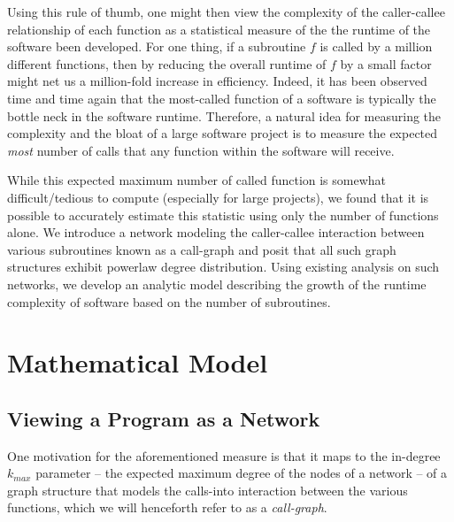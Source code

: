 \documentclass[11pt,a4paper,twocolumn]{article}
\begin{document}
\begin{singlespace}
Using this rule of thumb, one might then view the complexity of the caller-callee
relationship of each function as a statistical measure of the the runtime of the 
software been developed. For one thing, if a subroutine $f$ is called by a million 
different functions, then by reducing the overall runtime of $f$ by a small factor 
might net us a million-fold increase in efficiency. Indeed, it has been observed
time and time again \cite{something} that the most-called function of a software 
is typically the bottle neck in the software runtime. Therefore, a natural idea for
measuring the complexity and the bloat of a large software project is to measure 
the expected \emph{most} number of calls that any function within the software 
will receive.

While this expected maximum number of called function is somewhat difficult/tedious
to compute (especially for large projects), we found that it is possible to accurately
estimate this statistic using only the number of functions alone. We introduce a 
network modeling the caller-callee interaction between various subroutines known
as a call-graph and posit that all such graph structures exhibit powerlaw degree 
distribution. Using existing analysis on such networks, we develop an analytic 
model describing the growth of the runtime complexity of software based on the
number of subroutines.


\section{Mathematical Model}
\subsection{Viewing a Program as a Network}
One motivation for the aforementioned measure is that it maps to the in-degree
$k_{max}$ parameter -- the expected maximum degree of the nodes of a network --
of a graph structure that models the calls-into interaction between the various
functions, which we will henceforth refer to as a \emph{call-graph}.


\end{singlespace}
\end{document}
